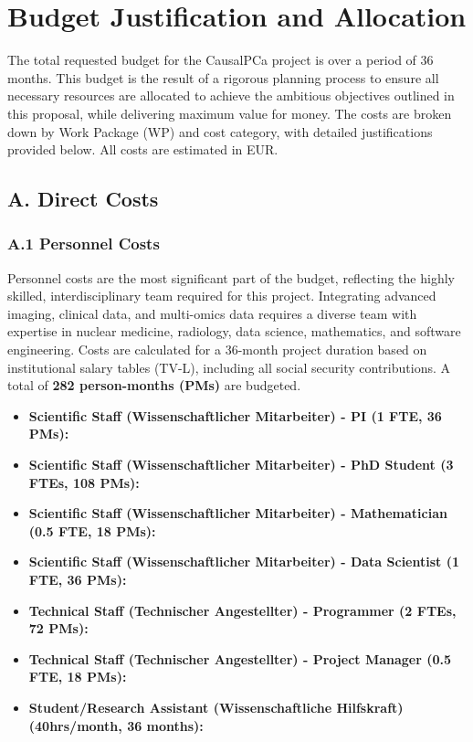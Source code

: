 \section*{Budget Justification and Allocation}

The total requested budget for the CausalPCa project is \textbf{} over a period of 36 months. This budget is the result of a rigorous planning process to ensure all necessary resources are allocated to achieve the ambitious objectives outlined in this proposal, while delivering maximum value for money. The costs are broken down by Work Package (WP) and cost category, with detailed justifications provided below. All costs are estimated in EUR.

\subsection*{A. Direct Costs}

\subsubsection*{A.1 Personnel Costs}
Personnel costs are the most significant part of the budget, reflecting the highly skilled, interdisciplinary team required for this project. Integrating advanced imaging, clinical data, and multi-omics data requires a diverse team with expertise in nuclear medicine, radiology, data science, mathematics, and software engineering. Costs are calculated for a 36-month project duration based on institutional salary tables (TV-L), including all social security contributions. A total of \textbf{282 person-months (PMs)} are budgeted.

\begin{itemize}
    \item \textbf{Scientific Staff (Wissenschaftlicher Mitarbeiter) - PI (1 FTE, 36 PMs):} 
    \item \textbf{Scientific Staff (Wissenschaftlicher Mitarbeiter) - PhD Student (3 FTEs, 108 PMs):} 
    \item \textbf{Scientific Staff (Wissenschaftlicher Mitarbeiter) - Mathematician (0.5 FTE, 18 PMs):} 
    \item \textbf{Scientific Staff (Wissenschaftlicher Mitarbeiter) - Data Scientist (1 FTE, 36 PMs):} 
    \item \textbf{Technical Staff (Technischer Angestellter) - Programmer (2 FTEs, 72 PMs):} 
    \item \textbf{Technical Staff (Technischer Angestellter) - Project Manager (0.5 FTE, 18 PMs):} 
    \item \textbf{Student/Research Assistant (Wissenschaftliche Hilfskraft) (40hrs/month, 36 months):} 
\end{itemize}

